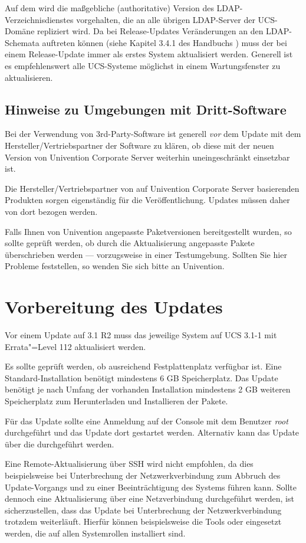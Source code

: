 Auf dem \ucsMaster{} wird die maßgebliche (authoritative) Version des
LDAP-Verzeichnisdienstes vorgehalten, die an alle übrigen LDAP-Server
der UCS-Domäne repliziert wird. Da bei Release-Updates Veränderungen
an den LDAP-Schemata auftreten können (siehe
Kapitel 3.4.1 des Handbuchs \cite{UCS-Handbuch}) muss der \ucsMaster{} bei einem
Release-Update immer als erstes System aktualisiert werden.
Generell ist es empfehlenswert alle UCS-Systeme möglichst in einem
Wartungsfenster zu aktualisieren. 

\section{Hinweise zu Umgebungen mit Dritt-Software}

Bei der Verwendung von 3rd-Party-Software ist generell \emph{vor} dem Update
mit dem Hersteller/Vertriebspartner der Software zu klären, ob
diese mit der neuen Version von Univention Corporate Server weiterhin
uneingeschränkt einsetzbar ist. 

Die Hersteller/Vertriebspartner von auf Univention Corporate Server
basierenden Produkten sorgen eigenständig für die Veröffentlichung. Updates
müssen daher von dort bezogen werden.

Falls Ihnen von Univention angepasste Paketversionen bereitgestellt wurden, so
sollte geprüft werden, ob durch die Aktualisierung angepasste Pakete
überschrieben werden --- vorzugsweise in einer Testumgebung. Sollten Sie hier
Probleme feststellen, so wenden Sie sich bitte an Univention.

\chapter{Vorbereitung des Updates}
Vor einem Update auf \ucsUAS{} 3.1 R2 muss das jeweilige System auf UCS 3.1-1 mit Errata"=Level 112 aktualisiert werden.

Es sollte geprüft werden, ob ausreichend Festplattenplatz verfügbar ist. Eine
Standard-Installation benötigt mindestens 6 GB Speicherplatz. Das
Update benötigt je nach Umfang der vorhanden Installation mindestens 2 GB
weiteren Speicherplatz zum Herunterladen und Installieren der Pakete.

Für das Update sollte eine Anmeldung auf der Console mit dem
Benutzer \emph{root} durchgeführt und das Update dort gestartet werden.
Alternativ kann das Update über die \ucsUMC{} durchgeführt werden.

Eine Remote-Aktualisierung über SSH wird nicht empfohlen, da dies
beispielsweise bei Unterbrechung der Netzwerkverbindung zum Abbruch des
Update-Vorgangs und zu einer Beeinträchtigung des Systems führen kann. Sollte
dennoch eine Aktualisierung über eine Netzverbindung durchgeführt werden, ist
sicherzustellen, dass das Update bei Unterbrechung der Netzwerkverbindung trotzdem
weiterläuft. Hierfür können beispielsweise die Tools  oder
 eingesetzt werden, die auf allen Systemrollen installiert sind.


